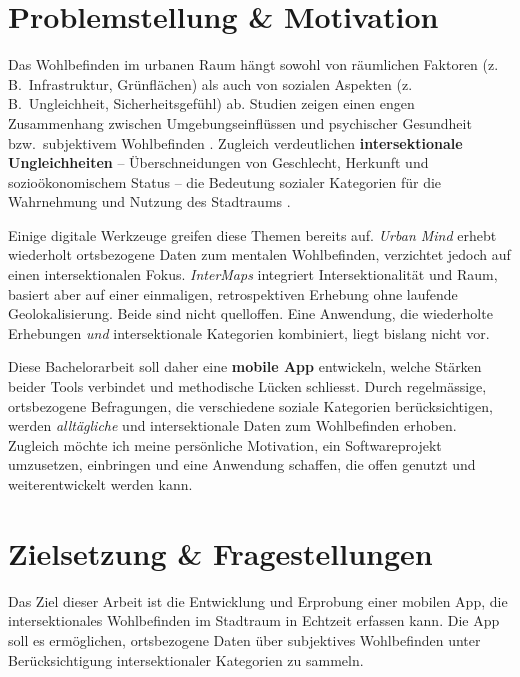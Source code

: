 \documentclass{template}
\begin{document}
\maketitle

\section{Problemstellung \& Motivation}
Das Wohlbefinden im urbanen Raum hängt sowohl von räumlichen Faktoren (z.\,B.\ Infrastruktur, Grünflächen) als auch von sozialen Aspekten (z.\,B.\ Ungleichheit, Sicherheitsgefühl) ab. Studien zeigen einen engen Zusammenhang zwischen Umgebungseinflüssen und psychischer Gesundheit bzw.\ subjektivem Wohlbefinden \parencite{kan_impacts_2022, hammoud_smartphone-based_2024, bergou_mental_2022}. Zugleich verdeutlichen \textbf{intersektionale Ungleichheiten} – Überschneidungen von Geschlecht, Herkunft und sozioökonomischem Status – die Bedeutung sozialer Kategorien für die Wahrnehmung und Nutzung des Stadtraums \parencite{webster_centering_2021, rodo-de-zarate_developing_2014, beebeejaun_race_2022}.

Einige digitale Werkzeuge greifen diese Themen bereits auf. \emph{Urban Mind} \parencite{bakolis_urban_2018} erhebt wiederholt ortsbezogene Daten zum mentalen Wohlbefinden, verzichtet jedoch auf einen intersektionalen Fokus. \emph{InterMaps} \parencite{rodo-de-zarate_developing_2014} integriert Intersektionalität und Raum, basiert aber auf einer einmaligen, retrospektiven Erhebung ohne laufende Geolokalisierung. Beide sind nicht quelloffen. Eine Anwendung, die wiederholte Erhebungen \emph{und} intersektionale Kategorien kombiniert, liegt bislang nicht vor.

Diese Bachelorarbeit soll daher eine \textbf{mobile App} entwickeln, welche Stärken beider Tools verbindet und methodische Lücken schliesst. Durch regelmässige, ortsbezogene Befragungen, die verschiedene soziale Kategorien berücksichtigen, werden \emph{alltägliche} und intersektionale Daten zum Wohlbefinden erhoben. Zugleich möchte ich meine persönliche Motivation, ein Softwareprojekt umzusetzen, einbringen und eine Anwendung schaffen, die offen genutzt und weiterentwickelt werden kann.



\section{Zielsetzung \& Fragestellungen}
Das Ziel dieser Arbeit ist die Entwicklung und Erprobung einer mobilen App, die intersektionales Wohlbefinden im Stadtraum in Echtzeit erfassen kann. Die App soll es ermöglichen, ortsbezogene Daten über subjektives Wohlbefinden unter Berücksichtigung intersektionaler Kategorien zu sammeln.
\end{document}
